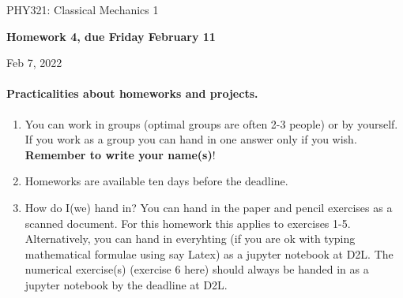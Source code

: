 \documentclass[%
oneside,                 %
final,                   %
10pt]{article}
\begin{document}

\newcommand{\exercisesection}[1]{\subsection*{#1}}






\thispagestyle{empty}

\begin{center}
{\LARGE\bf
\begin{spacing}{1.25}
PHY321: Classical Mechanics 1
\end{spacing}
}
\end{center}


\begin{center}
{\bf Homework 4, due Friday  February 11${}^{}$} \\ [0mm]
\end{center}

\begin{center}
\end{center}
    

\begin{center}
Feb 7, 2022
\end{center}

\vspace{1cm}


\paragraph{Practicalities about  homeworks and projects.}
\begin{enumerate}
\item You can work in groups (optimal groups are often 2-3 people) or by yourself. If you work as a group you can hand in one answer only if you wish. \textbf{Remember to write your name(s)}!

\item Homeworks are available ten days before the deadline.

\item How do I(we)  hand in?  You can hand in the paper and pencil exercises as a scanned document. For this homework this applies to exercises 1-5. Alternatively, you can hand in everyhting (if you are ok with typing mathematical formulae using say Latex) as a jupyter notebook at D2L. The numerical exercise(s) (exercise 6 here) should always be handed in as a jupyter notebook by the deadline at D2L. 
\end{enumerate}
\end{document}
